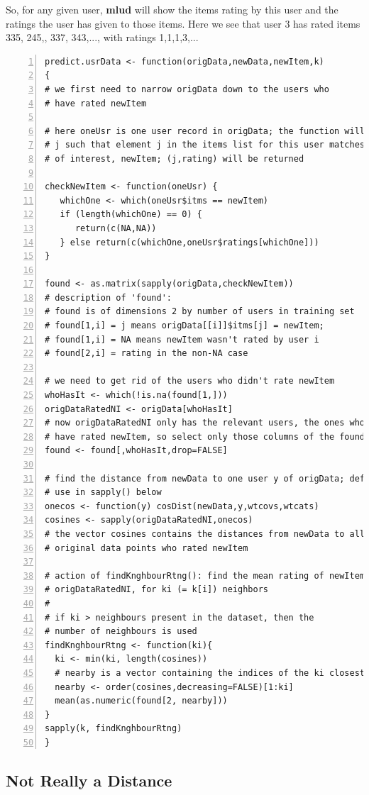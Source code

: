 So, for any given user, \textbf{mlud} will show the items rating by this
user and the ratings the user has given to those items.  Here we see
that user 3 has rated items 335, 245,, 337, 343,..., with ratings 1,1,1,3,...

\begin{lstlisting}[numbers=left]
predict.usrData <- function(origData,newData,newItem,k)
{
# we first need to narrow origData down to the users who 
# have rated newItem

# here oneUsr is one user record in origData; the function will look for a 
# j such that element j in the items list for this user matches the item 
# of interest, newItem; (j,rating) will be returned

checkNewItem <- function(oneUsr) {
   whichOne <- which(oneUsr$itms == newItem)
   if (length(whichOne) == 0) {
      return(c(NA,NA))
   } else return(c(whichOne,oneUsr$ratings[whichOne]))
}

found <- as.matrix(sapply(origData,checkNewItem))
# description of 'found':
# found is of dimensions 2 by number of users in training set
# found[1,i] = j means origData[[i]]$itms[j] = newItem;
# found[1,i] = NA means newItem wasn't rated by user i
# found[2,i] = rating in the non-NA case

# we need to get rid of the users who didn't rate newItem
whoHasIt <- which(!is.na(found[1,]))
origDataRatedNI <- origData[whoHasIt]
# now origDataRatedNI only has the relevant users, the ones who 
# have rated newItem, so select only those columns of the found matrix
found <- found[,whoHasIt,drop=FALSE]

# find the distance from newData to one user y of origData; defined for
# use in sapply() below
onecos <- function(y) cosDist(newData,y,wtcovs,wtcats)
cosines <- sapply(origDataRatedNI,onecos)
# the vector cosines contains the distances from newData to all the
# original data points who rated newItem

# action of findKnghbourRtng(): find the mean rating of newItem in
# origDataRatedNI, for ki (= k[i]) neighbors
#
# if ki > neighbours present in the dataset, then the 
# number of neighbours is used
findKnghbourRtng <- function(ki){
  ki <- min(ki, length(cosines))
  # nearby is a vector containing the indices of the ki closest neighbours
  nearby <- order(cosines,decreasing=FALSE)[1:ki]
  mean(as.numeric(found[2, nearby]))
}
sapply(k, findKnghbourRtng)
}
\end{lstlisting}

\subsection{Not Really a Distance}


